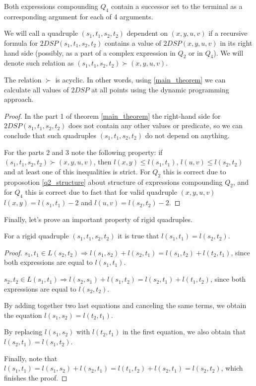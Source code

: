 \begin{proposition}
Both expressions compounding $Q_4$ contain a successor set to the terminal as a corresponding argument for each of 4 arguments.
\end{proposition}

We will call a quadruple $(s_1, t_1, s_2, t_2)$ dependent on $(x, y, u, v)$ if a recursive formula for $2DSP(s_1, t_1, s_2, t_2)$ contains a value of $2DSP(x, y, u, v)$ in its right hand side (possibly, as a part of a complex expression in $Q_2$ or in $Q_4$). We will denote such relation as $(s_1, t_1, s_2, t_2) \succ (x, y, u, v)$.

\begin{proposition}
The relation $\succ$ is acyclic. In other words, using \ref{main_theorem} we can calculate all values of $2DSP$ at all points using the dynamic programming approach.
\end{proposition}
\begin{proof}
In the part 1 of theorem \ref{main_theorem} the right-hand side for $2DSP(s_1, t_1, s_2, t_2)$ does not contain any other values or predicate, so we can conclude that such quadruples $(s_1, t_1, s_2, t_2)$ do not depend on anything.

For the parts 2 and 3 note the following property: if $(s_1, t_1, s_2, t_2) \succ (x, y, u, v)$, then $l(x, y) \leq l(s_1, t_1)$, $l(u, v) \leq l(s_2, t_2)$ and at least one of this inequalities is strict. For $Q_2$ this is correct due to proposotion \ref{q2_structure} about structure of expressions compounding $Q_2$, and for $Q_4$ this is correct due to fact that for valid quadruple $(x, y, u, v)$ $l(x, y) = l(s_1, t_1) - 2$ and $l(u, v) = l(s_2, t_2) - 2$.
\end{proof}

Finally, let's prove an important property of rigid quadruples.

\begin{proposition} \label{eql_ap}
For a rigid quadruple $(s_1, t_1, s_2, t_2)$ it is true that $l(s_1, t_1) = l(s_2, t_2)$.
\end{proposition}
\begin{proof} 

$s_1, t_1 \in L(s_2, t_2) \Rightarrow l(s_1, s_2) + l(s_2, t_1) = l(s_1, t_2) + l(t_2, t_1)$, since both expressions are equal to $l(s_1, t_1)$.

$s_2, t_2 \in L(s_1, t_1) \Rightarrow l(s_2, s_1) + l(s_1, t_2) = l(s_2, t_1) + l(t_1, t_2)$, since both expressions are equal to $l(s_2, t_2)$.

By adding together two last equations and canceling the same terms, we obtain the equation $l(s_1, s_2) = l(t_2, t_1)$. 

By replacing $l(s_1, s_2)$ with $l(t_2, t_1)$ in the first equation, we also obtain that $l(s_2, t_1) = l(s_1, t_2)$.

Finally, note that $l(s_1, t_1) = l(s_1, s_2) + l(s_2, t_1) = l(t_1, t_2) + l(s_2, t_1) = l(s_2, t_2)$, which finishes the proof.
\end{proof}

